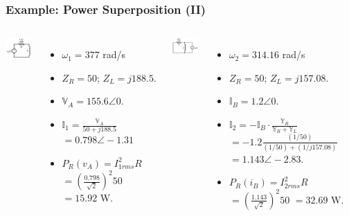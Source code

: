 \documentclass{beamer}
\begin{document}
\begin{frame}[fragile]
\frametitle{Example: Power Superposition (II)}

\begin{columns}[c]

\includegraphics[width=2cm]{src/super_example1a.png}
\begin{itemize}
\item $\omega_1 = 377$ rad/s
\item $Z_R = 50$; $Z_L = j188.5$.
\item $\mathbb{V}_A = 155.6 \angle 0$.
\item $\mathbb{I}_1 =  \frac{\mathbb{V}_A}{50 + j188.5}$
$=0.798 \angle -1.31$
\item $P_R(v_A) = I_{1rms}^2 R$
$=\left(\frac{0.798}{\sqrt{2}}\right)^2 50$
$=15.92$ W.
\end{itemize}

\includegraphics[width=2cm]{src/super_example1b.png}
\begin{itemize}
\item $\omega_2 = 314.16$ rad/s
\item $Z_R = 50$; $Z_L = j157.08$.
\item $\mathbb{I}_B = 1.2 \angle 0$.
\item $\mathbb{I}_2 =  -\mathbb{I}_B \cdot \frac{\mathbb{Y}_R}{\mathbb{Y}_R + \mathbb{Y}_L}$ 
$=-1.2 \frac{(1/50)}{(1/50) + (1/j157.08)}$
$= 1.143 \angle -2.83$.
\item $P_R(i_B) = I_{2rms}^2 R$
$=\left(\frac{1.143}{\sqrt{2}}\right)^2 50$
$=32.69$ W.
\end{itemize}

\end{columns}



\end{frame}
\end{document}
